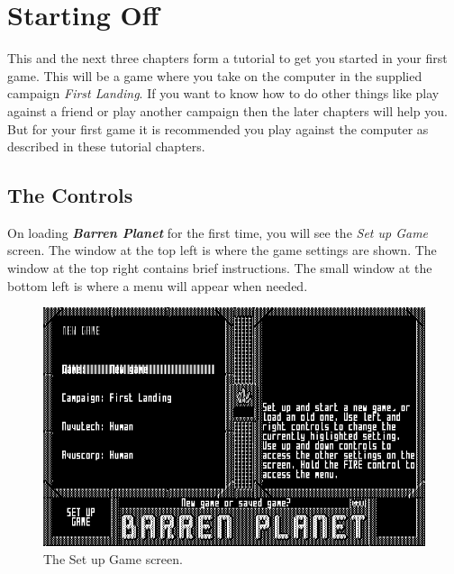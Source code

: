%
%
%
%

\chapter{Starting Off}

\noindent
This and the next three chapters form a tutorial to get you started in your first game. This will be a game where you take on the computer in the supplied campaign {\it First Landing}. If you want to know how to do other things like play against a friend or play another campaign then the later chapters will help you. But for your first game it is recommended you play against the computer as described in these tutorial chapters.

\section{The Controls}

\noindent
On loading {\bf \it Barren Planet} for the first time, you will see the {\it Set up Game} screen. The window at the top left is where the game settings are shown. The window at the top right contains brief instructions. The small window at the bottom left is where a menu will appear when needed.

\begin{figure}[h]
  \includegraphics[width=\textwidth]{new-game}
  \caption{The Set up Game screen.}
\end{figure}

